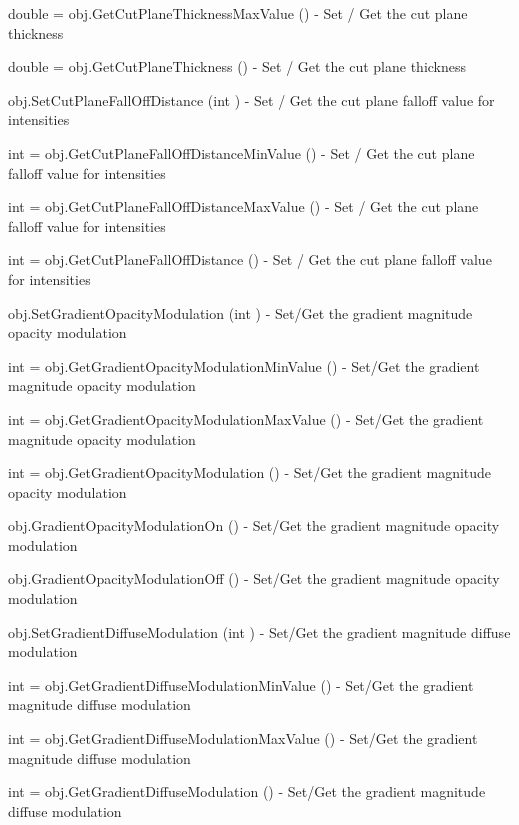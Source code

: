\begin{DoxyItemize}
\item {\ttfamily double = obj.\-Get\-Cut\-Plane\-Thickness\-Max\-Value ()} -\/ Set / Get the cut plane thickness  
\item {\ttfamily double = obj.\-Get\-Cut\-Plane\-Thickness ()} -\/ Set / Get the cut plane thickness  
\item {\ttfamily obj.\-Set\-Cut\-Plane\-Fall\-Off\-Distance (int )} -\/ Set / Get the cut plane falloff value for intensities  
\item {\ttfamily int = obj.\-Get\-Cut\-Plane\-Fall\-Off\-Distance\-Min\-Value ()} -\/ Set / Get the cut plane falloff value for intensities  
\item {\ttfamily int = obj.\-Get\-Cut\-Plane\-Fall\-Off\-Distance\-Max\-Value ()} -\/ Set / Get the cut plane falloff value for intensities  
\item {\ttfamily int = obj.\-Get\-Cut\-Plane\-Fall\-Off\-Distance ()} -\/ Set / Get the cut plane falloff value for intensities  
\item {\ttfamily obj.\-Set\-Gradient\-Opacity\-Modulation (int )} -\/ Set/\-Get the gradient magnitude opacity modulation  
\item {\ttfamily int = obj.\-Get\-Gradient\-Opacity\-Modulation\-Min\-Value ()} -\/ Set/\-Get the gradient magnitude opacity modulation  
\item {\ttfamily int = obj.\-Get\-Gradient\-Opacity\-Modulation\-Max\-Value ()} -\/ Set/\-Get the gradient magnitude opacity modulation  
\item {\ttfamily int = obj.\-Get\-Gradient\-Opacity\-Modulation ()} -\/ Set/\-Get the gradient magnitude opacity modulation  
\item {\ttfamily obj.\-Gradient\-Opacity\-Modulation\-On ()} -\/ Set/\-Get the gradient magnitude opacity modulation  
\item {\ttfamily obj.\-Gradient\-Opacity\-Modulation\-Off ()} -\/ Set/\-Get the gradient magnitude opacity modulation  
\item {\ttfamily obj.\-Set\-Gradient\-Diffuse\-Modulation (int )} -\/ Set/\-Get the gradient magnitude diffuse modulation  
\item {\ttfamily int = obj.\-Get\-Gradient\-Diffuse\-Modulation\-Min\-Value ()} -\/ Set/\-Get the gradient magnitude diffuse modulation  
\item {\ttfamily int = obj.\-Get\-Gradient\-Diffuse\-Modulation\-Max\-Value ()} -\/ Set/\-Get the gradient magnitude diffuse modulation  
\item {\ttfamily int = obj.\-Get\-Gradient\-Diffuse\-Modulation ()} -\/ Set/\-Get the gradient magnitude diffuse modulation  

\end{DoxyItemize}
